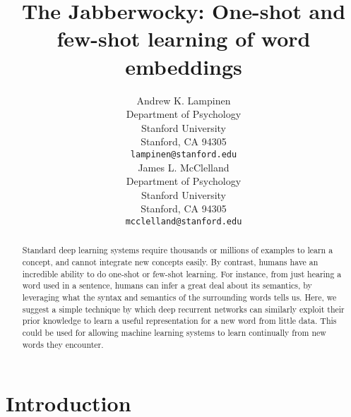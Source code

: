\documentclass{article}
\title{The Jabberwocky: One-shot and few-shot learning of word embeddings}
\author{
  Andrew K. Lampinen\\
  Department of Psychology\\
  Stanford University\\
  Stanford, CA 94305 \\
  \texttt{lampinen@stanford.edu} \\
  \And
  James L. McClelland\\
  Department of Psychology\\
  Stanford University\\
  Stanford, CA 94305 \\
  \texttt{mcclelland@stanford.edu} \\
}
\begin{document}
\maketitle

\begin{abstract}
Standard deep learning systems require thousands or millions of examples to learn a concept, and cannot integrate new concepts easily. By contrast, humans have an incredible ability to do one-shot or few-shot learning. For instance, from just hearing a word used in a sentence, humans can infer a great deal about its semantics, by leveraging what the syntax and semantics of the surrounding words tells us. Here, we suggest a simple technique by which deep recurrent networks can similarly exploit their prior knowledge to learn a useful representation for a new word from little data. This could be used for allowing machine learning systems to learn continually from new words they encounter. 
\end{abstract}

\section{Introduction}
\end{document}
